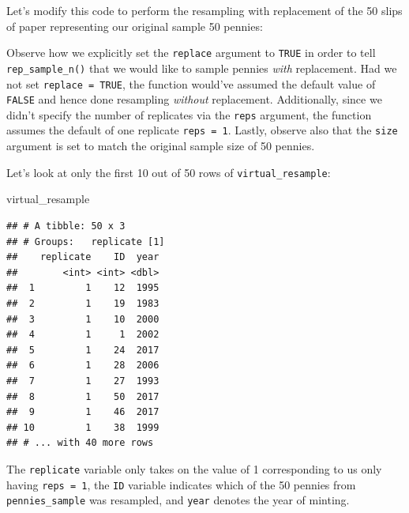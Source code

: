 \documentclass[
]{book}
\newenvironment{Shaded}{\begin{snugshade}}{\end{snugshade}}
\newcommand{\DataTypeTok}[1]{\textcolor[rgb]{0.13,0.29,0.53}{#1}}
\newcommand{\DecValTok}[1]{\textcolor[rgb]{0.00,0.00,0.81}{#1}}
\newcommand{\KeywordTok}[1]{\textcolor[rgb]{0.13,0.29,0.53}{\textbf{#1}}}
\newcommand{\NormalTok}[1]{#1}
\newcommand{\OperatorTok}[1]{\textcolor[rgb]{0.81,0.36,0.00}{\textbf{#1}}}
\newcommand{\OtherTok}[1]{\textcolor[rgb]{0.56,0.35,0.01}{#1}}
\newcommand{\StringTok}[1]{\textcolor[rgb]{0.31,0.60,0.02}{#1}}
\begin{document}
Let's modify this code to perform the resampling with replacement of the 50 slips of paper representing our original sample 50 pennies:

\begin{Shaded}
\end{Shaded}

Observe how we explicitly set the \texttt{replace} argument to \texttt{TRUE} in order to tell \texttt{rep\_sample\_n()} that we would like to sample pennies  \emph{with} replacement. Had we not set \texttt{replace\ =\ TRUE}, the function would've assumed the default value of \texttt{FALSE} and hence done resampling \emph{without} replacement. Additionally, since we didn't specify the number of replicates via the \texttt{reps} argument, the function assumes the default of one replicate \texttt{reps\ =\ 1}. Lastly, observe also that the \texttt{size} argument is set to match the original sample size of 50 pennies.

Let's look at only the first 10 out of 50 rows of \texttt{virtual\_resample}:

\begin{Shaded}
\begin{Highlighting}[]
\NormalTok{virtual_resample}
\end{Highlighting}
\end{Shaded}

\begin{verbatim}
## # A tibble: 50 x 3
## # Groups:   replicate [1]
##    replicate    ID  year
##        <int> <int> <dbl>
##  1         1    12  1995
##  2         1    19  1983
##  3         1    10  2000
##  4         1     1  2002
##  5         1    24  2017
##  6         1    28  2006
##  7         1    27  1993
##  8         1    50  2017
##  9         1    46  2017
## 10         1    38  1999
## # ... with 40 more rows
\end{verbatim}

The \texttt{replicate} variable only takes on the value of 1 corresponding to us only having \texttt{reps\ =\ 1}, the \texttt{ID} variable indicates which of the 50 pennies from \texttt{pennies\_sample} was resampled, and \texttt{year} denotes the year of minting.
\end{document}
